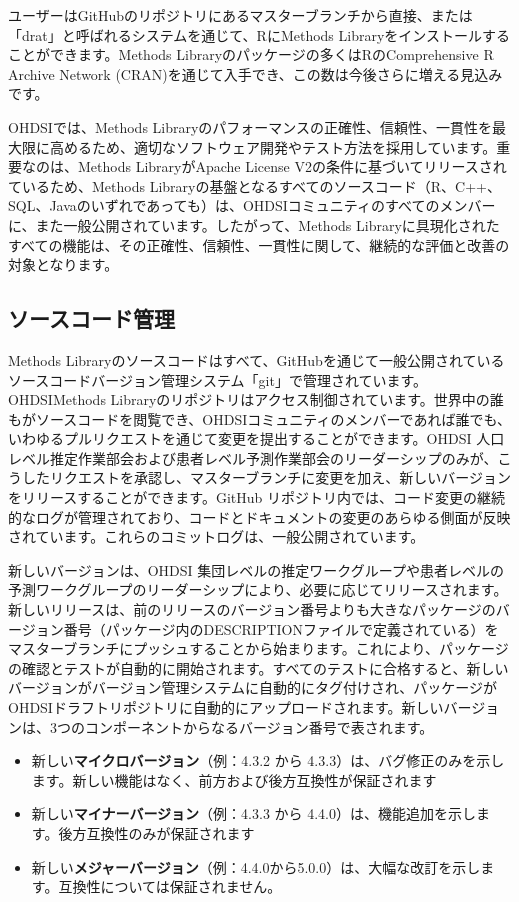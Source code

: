 \documentclass[
  11pt]{book}
\theoremstyle{definition}
\theoremstyle{definition}
\theoremstyle{definition}
\theoremstyle{definition}
\theoremstyle{remark}
\begin{document}
ユーザーはGitHubのリポジトリにあるマスターブランチから直接、または「drat」と呼ばれるシステムを通じて、RにMethods Libraryをインストールすることができます。Methods Libraryのパッケージの多くはRのComprehensive R Archive Network (CRAN)を通じて入手でき、この数は今後さらに増える見込みです。

OHDSIでは、Methods Libraryのパフォーマンスの正確性、信頼性、一貫性を最大限に高めるため、適切なソフトウェア開発やテスト方法を採用しています。重要なのは、Methods LibraryがApache License V2の条件に基づいてリリースされているため、Methods Libraryの基盤となるすべてのソースコード（R、C++、SQL、Javaのいずれであっても）は、OHDSIコミュニティのすべてのメンバーに、また一般公開されています。したがって、Methods Libraryに具現化されたすべての機能は、その正確性、信頼性、一貫性に関して、継続的な評価と改善の対象となります。

\subsection{ソースコード管理}\label{ux30bdux30fcux30b9ux30b3ux30fcux30c9ux7ba1ux7406}

Methods Libraryのソースコードはすべて、GitHubを通じて一般公開されているソースコードバージョン管理システム「git」で管理されています。OHDSIMethods Libraryのリポジトリはアクセス制御されています。世界中の誰もがソースコードを閲覧でき、OHDSIコミュニティのメンバーであれば誰でも、いわゆるプルリクエストを通じて変更を提出することができます。OHDSI 人口レベル推定作業部会および患者レベル予測作業部会のリーダーシップのみが、こうしたリクエストを承認し、マスターブランチに変更を加え、新しいバージョンをリリースすることができます。GitHub リポジトリ内では、コード変更の継続的なログが管理されており、コードとドキュメントの変更のあらゆる側面が反映されています。これらのコミットログは、一般公開されています。

新しいバージョンは、OHDSI 集団レベルの推定ワークグループや患者レベルの予測ワークグループのリーダーシップにより、必要に応じてリリースされます。新しいリリースは、前のリリースのバージョン番号よりも大きなパッケージのバージョン番号（パッケージ内のDESCRIPTIONファイルで定義されている）をマスターブランチにプッシュすることから始まります。これにより、パッケージの確認とテストが自動的に開始されます。すべてのテストに合格すると、新しいバージョンがバージョン管理システムに自動的にタグ付けされ、パッケージがOHDSIドラフトリポジトリに自動的にアップロードされます。新しいバージョンは、3つのコンポーネントからなるバージョン番号で表されます。

\begin{itemize}
\item
  新しい\textbf{マイクロバージョン}（例：4.3.2 から 4.3.3）は、バグ修正のみを示します。新しい機能はなく、前方および後方互換性が保証されます
\item
  新しい\textbf{マイナーバージョン}（例：4.3.3 から 4.4.0）は、機能追加を示します。後方互換性のみが保証されます
\item
  新しい\textbf{メジャーバージョン}（例：4.4.0から5.0.0）は、大幅な改訂を示します。互換性については保証されません。
\end{itemize}
\end{document}

